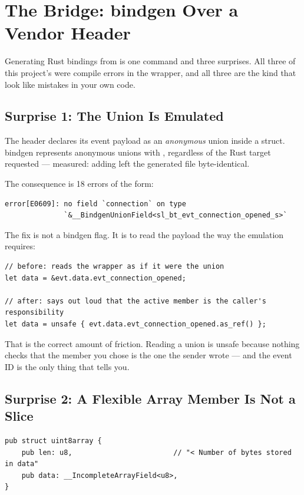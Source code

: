 \section{The Bridge: bindgen Over a Vendor Header}
\label{sec:ble-bridge}

Generating Rust bindings from  is one command and three surprises. All three
of this project's were compile errors in the wrapper, and all three are the kind that look like
mistakes in your own code.

\subsection{Surprise 1: The Union Is Emulated}

The header declares its event payload as an \emph{anonymous} union inside a struct. bindgen
represents anonymous unions with , regardless of the Rust target
requested — measured: adding  left the generated file
byte-identical.

The consequence is 18 errors of the form:

\begin{verbatim}
error[E0609]: no field `connection` on type
              `&__BindgenUnionField<sl_bt_evt_connection_opened_s>`
\end{verbatim}

The fix is not a bindgen flag. It is to read the payload the way the emulation requires:

\begin{verbatim}
// before: reads the wrapper as if it were the union
let data = &evt.data.evt_connection_opened;

// after: says out loud that the active member is the caller's responsibility
let data = unsafe { evt.data.evt_connection_opened.as_ref() };
\end{verbatim}

That  is the correct amount of friction. Reading a union is unsafe because nothing
checks that the member you chose is the one the sender wrote — and the event ID is the only thing that
tells you.

\subsection{Surprise 2: A Flexible Array Member Is Not a Slice}

\begin{verbatim}
pub struct uint8array {
    pub len: u8,                        // "< Number of bytes stored in data"
    pub data: __IncompleteArrayField<u8>,
}
\end{verbatim}

